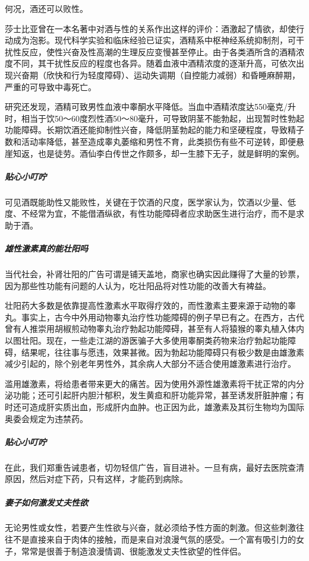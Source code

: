 何况，酒还可以败性。

莎士比亚曾在一本名著中对酒与性的关系作出这样的评价：酒激起了情欲，却使行动成为泡影。现代科学实验和临床经验已证实，酒精系中枢神经系统抑制剂，可干扰性反应，使性兴奋及性高潮的生理反应变慢甚至停止。由于各类酒所含的酒精浓度不同，其干扰性反应的程度也各异。随着血液中酒精浓度的逐渐升高，可依次出现兴奋期（欣快和行为轻度障碍）、运动失调期（自控能力减弱）和昏睡麻醉期，严重的可导致中毒死亡。

研究还发现，酒精可致男性血液中睾酮水平降低。当血中酒精浓度达550毫克/升时，相当于饮50～60度烈性酒50～80毫升，可导致阴茎不能勃起，出现暂时性勃起功能障碍。长期饮酒还能抑制性兴奋，降低阴茎勃起的能力和坚硬程度，导致精子数和活动率降低，甚至造成睾丸萎缩和男性不育，此类损伤有些不可逆转，即便悬崖知返，也是徒劳。酒仙李白传世之作颇多，却一生膝下无子，就是鲜明的案例。

\subparagraph{贴心小叮咛}

可见酒既能助性又能败性，关键在于饮酒的尺度，医学家认为，饮酒以少量、低度、不经常为宜，不能借酒纵欲，有性功能障碍者应求助医生进行治疗，而不是求助于酒。

\subparagraph{雄性激素真的能壮阳吗}

当代社会，补肾壮阳的广告可谓是铺天盖地，商家也确实因此赚得了大量的钞票，因为那些性功能有问题的人认为，吃壮阳品将对性功能的改善大有裨益。

壮阳药大多数是依靠提高性激素水平取得疗效的，而性激素主要来源于动物的睾丸。事实上，古今中外用动物睾丸治疗性功能障碍的例子早已有之。在西方，古代曾有人推崇用胡椒煎动物睾丸治疗勃起功能障碍，甚至有人将猿猴的睾丸植入体内以图壮阳。现在，一些走江湖的游医骗子大多使用睾酮类药物来治疗勃起功能障碍，结果呢，往往事与愿违，效果甚微。因为勃起功能障碍只有极少数是由雄激素减少引起的，除个别老年男性外，其余病人大部分不适合使用雄激素进行治疗。

滥用雄激素，将给患者带来更大的痛苦。因为使用外源性雄激素将干扰正常的内分泌功能；还可引起肝内胆汁郁积，发生黄疸和肝功能异常，甚至诱发肝脏肿瘤；有时还可造成肝实质出血，形成肝内血肿。也正因为此，雄激素及其衍生物均为国际奥委会规定为违禁药。

\subparagraph{贴心小叮咛}

在此，我们郑重告诫患者，切勿轻信广告，盲目进补。一旦有病，最好去医院查清原因，然后对症下药，只有这样，才能药到病除。

\subparagraph{妻子如何激发丈夫性欲}

无论男性或女性，若要产生性欲与兴奋，就必须给予性方面的刺激。但这些刺激往往不是直接来自于肉体的接触，而是来自对浪漫气氛的感受。一个富有吸引力的女子，常常是很善于制造浪漫情调、很能激发丈夫性欲望的性伴侣。


